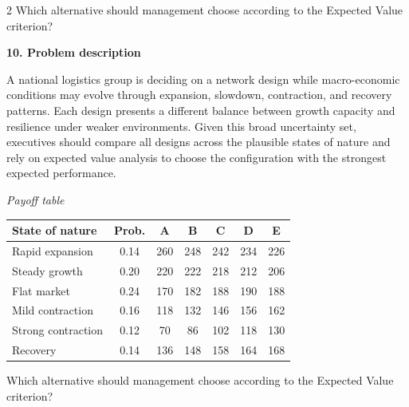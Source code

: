 \documentclass[12pt]{article}
\newcommand{\SubsectionBox}[1]{%
	\noindent\colorbox{gray!30}{%
		\parbox{\linewidth}{\textbf{#1}}%
	}\par\vspace{0.35cm}%
}
\begin{document}
\begin{multicols}{2}
				Which alternative should management choose according to the Expected Value criterion?

		\vspace{0.25cm}
		\SubsectionBox{10. Problem description}\vspace{-0.25cm}
		A national logistics group is deciding on a network design while macro-economic conditions may evolve through expansion, slowdown, contraction, and recovery patterns. Each design presents a different balance between growth capacity and resilience under weaker environments. Given this broad uncertainty set, executives should compare all designs across the plausible states of nature and rely on expected value analysis to choose the configuration with the strongest expected performance.
		
				\begin{center}
					\textit{Payoff table}
					\begin{tabular}{l c c c c c c}
						\toprule
						State of nature & Prob. & A & B & C & D & E \\
						\midrule
						Rapid expansion & 0.14 & 260 & 248 & 242 & 234 & 226 \\
						Steady growth & 0.20 & 220 & 222 & 218 & 212 & 206 \\
						Flat market & 0.24 & 170 & 182 & 188 & 190 & 188 \\
						Mild contraction & 0.16 & 118 & 132 & 146 & 156 & 162 \\
						Strong contraction & 0.12 & 70 & 86 & 102 & 118 & 130 \\
						Recovery & 0.14 & 136 & 148 & 158 & 164 & 168 \\
						\bottomrule
					\end{tabular}
				\end{center}
		
				Which alternative should management choose according to the Expected Value criterion?

	\end{multicols}
\end{document}
